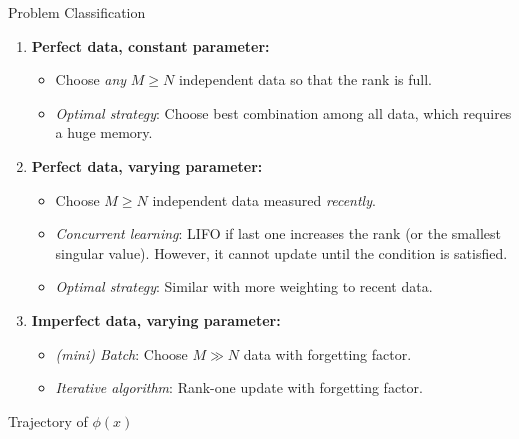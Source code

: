 \documentclass[]{beamer}
\theoremstyle{plain}
\theoremstyle{definition}
\theoremstyle{remark}
\begin{document}
\begin{frame}{Problem Classification}
	\begin{enumerate}
		\item<+-> \textbf{Perfect data, constant parameter:}
			\begin{itemize} 
				\item Choose \textit{any} $M \ge N$ independent data so that the rank
					is full.
				\item \textit{Optimal strategy}: Choose \alert{best combination} among
					all data, which requires a huge memory.
			\end{itemize}
		\item<+-> \textbf{Perfect data, varying parameter:}
			\begin{itemize}
				\item Choose $M \ge N$ independent data measured \textit{recently}.
				\item \textit{Concurrent learning}: \alert{LIFO} if last one increases
					the rank (or the smallest singular value). \alert{However}, it cannot
					update until the condition is satisfied.
				\item \textit{Optimal strategy}: Similar with more weighting to recent
					data.
			\end{itemize}
		\item<+-> \textbf{Imperfect data, varying parameter:}
			\begin{itemize}
				\item \textit{(mini) Batch}: Choose \alert{$M \gg N$} data with
					forgetting factor.
				\item \textit{Iterative algorithm}: Rank-one update with
					forgetting factor. 
		\end{itemize}
	\end{enumerate}
\end{frame}

\begin{frame}{Trajectory of $\phi(x)$}
	\centering
\end{frame}
\end{document}
